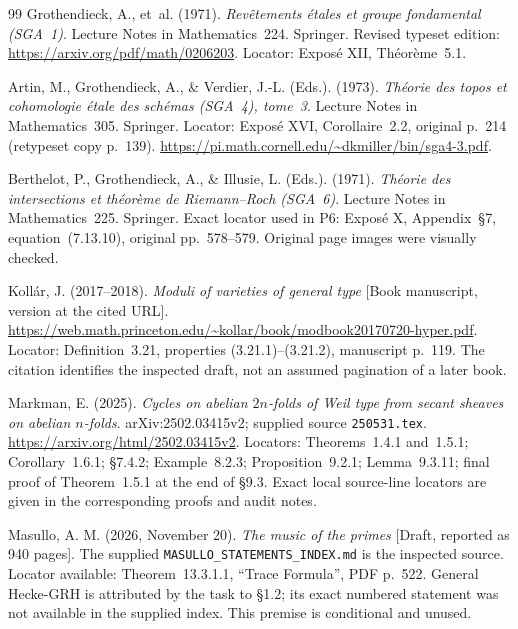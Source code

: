 \begin{thebibliography}{99}
Grothendieck, A., et~al. (1971). \emph{Rev\^etements \'etales et groupe fondamental (SGA~1)}. Lecture Notes in Mathematics~224. Springer. Revised typeset edition: \url{https://arxiv.org/pdf/math/0206203}. Locator: Expos\'e XII, Th\'eor\`eme~5.1.

Artin, M., Grothendieck, A., \& Verdier, J.-L. (Eds.). (1973). \emph{Th\'eorie des topos et cohomologie \'etale des sch\'emas (SGA~4), tome~3}. Lecture Notes in Mathematics~305. Springer. Locator: Expos\'e XVI, Corollaire~2.2, original p.~214 (retypeset copy p.~139). \url{https://pi.math.cornell.edu/~dkmiller/bin/sga4-3.pdf}.

Berthelot, P., Grothendieck, A., \& Illusie, L. (Eds.). (1971). \emph{Th\'eorie des intersections et th\'eor\`eme de Riemann--Roch (SGA~6)}. Lecture Notes in Mathematics~225. Springer. Exact locator used in P6: Expos\'e X, Appendix~\S7, equation~(7.13.10), original pp.~578--579. Original page images were visually checked.

Koll\'ar, J. (2017--2018). \emph{Moduli of varieties of general type} [Book manuscript, version at the cited URL]. \url{https://web.math.princeton.edu/~kollar/book/modbook20170720-hyper.pdf}. Locator: Definition~3.21, properties (3.21.1)--(3.21.2), manuscript p.~119. The citation identifies the inspected draft, not an assumed pagination of a later book.

Markman, E. (2025). \emph{Cycles on abelian $2n$-folds of Weil type from secant sheaves on abelian $n$-folds}. arXiv:2502.03415v2; supplied source \texttt{250531.tex}. \url{https://arxiv.org/html/2502.03415v2}. Locators: Theorems~1.4.1 and~1.5.1; Corollary~1.6.1; \S7.4.2; Example~8.2.3; Proposition~9.2.1; Lemma~9.3.11; final proof of Theorem~1.5.1 at the end of \S9.3. Exact local source-line locators are given in the corresponding proofs and audit notes.

Masullo, A. M. (2026, November 20). \emph{The music of the primes} [Draft, reported as 940 pages]. The supplied \texttt{MASULLO\_STATEMENTS\_INDEX.md} is the inspected source. Locator available: Theorem~13.3.1.1, ``Trace Formula'', PDF p.~522. General Hecke-GRH is attributed by the task to \S1.2; its exact numbered statement was not available in the supplied index. This premise is conditional and unused.


\end{thebibliography}
